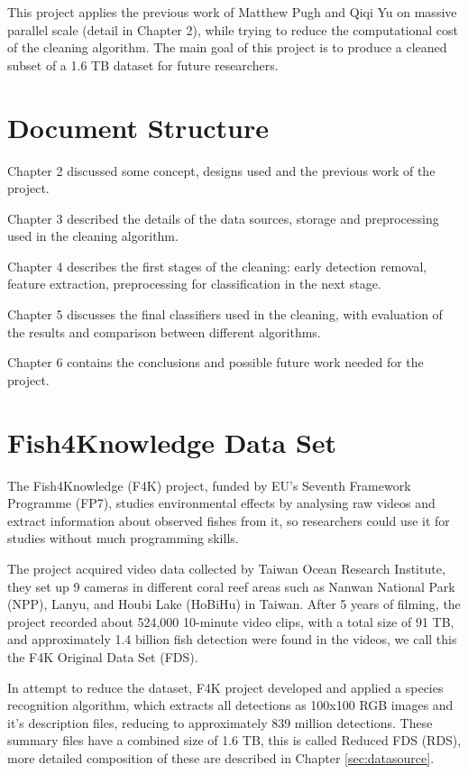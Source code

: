 \documentclass[bsc,logo,twoside,fullspacing,parskip]{infthesis}
\begin{document}

This project applies the previous work of Matthew Pugh\cite{P1} and Qiqi Yu\cite{P3} on massive parallel scale (detail in Chapter 2), while trying to reduce the computational cost of the cleaning algorithm. The main goal of this project is to produce a cleaned subset of a 1.6 TB dataset for future researchers.

\section{Document Structure}

Chapter 2 discussed some concept, designs used and the previous work of the project.

Chapter 3 described the details of the data sources, storage and preprocessing used in the cleaning algorithm.

Chapter 4 describes the first stages of the cleaning: early detection removal, feature extraction, preprocessing for classification in the next stage.

Chapter 5 discusses the final classifiers used in the cleaning, with evaluation of the results and comparison between different algorithms. 

Chapter 6 contains the conclusions and possible future work needed for the project.

\section{Fish4Knowledge Data Set}

The Fish4Knowledge (F4K) project, funded by EU's Seventh Framework Programme (FP7), studies environmental effects by analysing raw videos and extract information about observed fishes from it, so researchers could use it for studies without much programming skills. 

The project acquired video data collected by Taiwan Ocean Research Institute, they set up 9 cameras in different coral reef areas such as Nanwan National Park (NPP), Lanyu, and Houbi Lake (HoBiHu) in Taiwan. 
After 5 years of filming, the project recorded about 524,000 10-minute video clips, with a total size of 91 TB, and approximately 1.4 billion fish detection were found in the videos, we call this the F4K Original Data Set (FDS).

In attempt to reduce the dataset, F4K project developed and applied a species recognition algorithm, which extracts all detections as 100x100 RGB images and it's description files, reducing to approximately 839 million detections. These summary files have a combined size of 1.6 TB, this is called Reduced FDS (RDS), more detailed composition of these are described in Chapter \ref{sec:datasource}.
\end{document}
